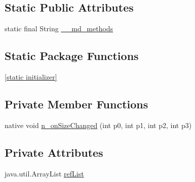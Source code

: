 \subsection*{Static Public Attributes}
\begin{CompactItemize}
\item 
static final String \hyperlink{classmd5b60ffeb829f638581ab2bb9b1a7f4f3f_1_1_navigation_menu_renderer_0f4bfebe2cdfd607a2a7599e832cfbdc}{\_\-\_\-md\_\-methods}
\end{CompactItemize}
\subsection*{Static Package Functions}
\begin{CompactItemize}
\item 
\hyperlink{classmd5b60ffeb829f638581ab2bb9b1a7f4f3f_1_1_navigation_menu_renderer_98a35b1cf5c157fc7aacf89402e6bed1}{\mbox{[}static initializer\mbox{]}}
\end{CompactItemize}
\subsection*{Private Member Functions}
\begin{CompactItemize}
\item 
native void \hyperlink{classmd5b60ffeb829f638581ab2bb9b1a7f4f3f_1_1_navigation_menu_renderer_cb580f3aa63c0893ea67733b7dd1de9a}{n\_\-onSizeChanged} (int p0, int p1, int p2, int p3)
\end{CompactItemize}
\subsection*{Private Attributes}
\begin{CompactItemize}
\item 
java.util.ArrayList \hyperlink{classmd5b60ffeb829f638581ab2bb9b1a7f4f3f_1_1_navigation_menu_renderer_717e3e89de8a97cac2daee362f553abe}{refList}
\end{CompactItemize}


